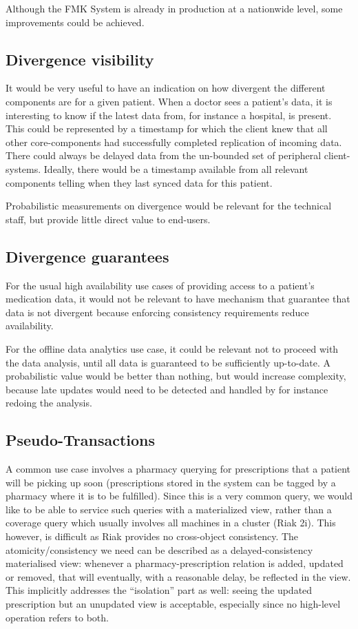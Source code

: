 \documentclass[english]{article}
\begin{document}
Although the FMK System is already in production at a nationwide level, some improvements could be achieved.


\subsection{Divergence visibility}

It would be very useful to have an indication on how divergent the different components are for a given patient. When a doctor sees a patient's data, it is interesting to know if the latest data from, for instance a hospital, is present. This could be represented by a timestamp for which the client knew that all other core-components had successfully completed replication of incoming data. There could always be delayed data from the un-bounded set of peripheral client-systems. Ideally, there would be a timestamp available from all relevant components telling when they last synced data for this patient.

Probabilistic measurements on divergence would be relevant for the technical staff, but provide little direct value to end-users. 


\subsection{Divergence guarantees}

For the usual high availability use cases of providing access to a patient's medication data, it would not be relevant to have mechanism that guarantee that data is not divergent because enforcing consistency requirements reduce availability.

For the offline data analytics use case, it could be relevant not to proceed with the data analysis, until all data is guaranteed to be sufficiently up-to-date. A probabilistic value would be better than nothing, but would increase complexity, because late updates would need to be detected and handled by for instance redoing the analysis.


\subsection{Pseudo-Transactions}

A common use case involves a pharmacy querying for prescriptions that a patient will be picking up soon (prescriptions stored in the system
can be tagged by a pharmacy where it is to be fulfilled). Since this is a very common query, we would like to be able to service such queries with a materialized view, rather than a coverage query which usually involves all machines in a cluster (Riak 2i). This however, is difficult as Riak provides no cross-object consistency. The atomicity/consistency we need can be described as a delayed-consistency materialised view:
whenever a pharmacy-prescription relation is added, updated or removed, that will eventually, with a reasonable delay, be reflected in the view.
This implicitly addresses the ``isolation'' part as well: seeing the updated prescription but an unupdated view is acceptable, especially
since no high-level operation refers to both.
\end{document}
